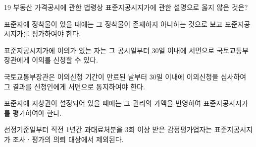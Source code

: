 \begin{question}{19}
부동산 가격공시에 관한 법령상 표준지공시지가에 관한 설명으로 옳지 않은 것은?
\begin{choices}
  \item 표준지에 정착물이 있을 때에는 그 정착물이 존재하지 아니하는 것으로 보고 표준지공시지가를 평가하여야 한다.
  \item 표준지공시지가에 이의가 있는 자는 그 공시일부터 30일 이내에 서면으로 국토교통부장관에게 이의를 신청할 수 있다.
  \item 국토교통부장관은 이의신청 기간이 만료된 날부터 30일 이내에 이의신청을 심사하여 그 결과를 신청인에게 서면으로 통지하여야 한다.
  \item 표준지에 지상권이 설정되어 있을 때에는 그 권리의 가액을 반영하여 표준지공시지가를 평가하여야 한다.
  \item 선정기준일부터 직전 1년간 과태료처분을 3회 이상 받은 감정평가업자는 표준지공시지가 조사ㆍ평가의 의뢰 대상에서 제외된다.
\end{choices}
\end{question}
